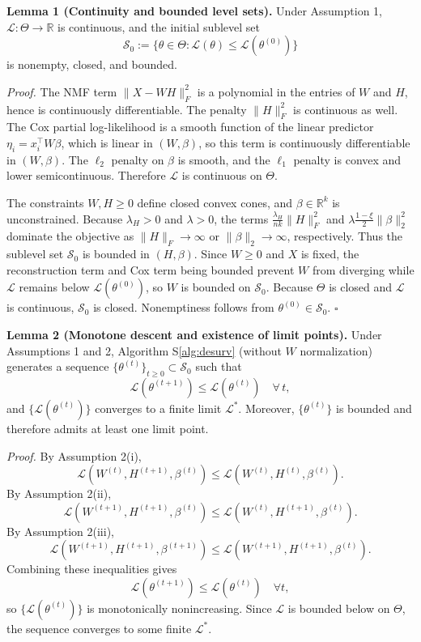 \documentclass[
]{article}
\begin{document}
\vspace{0.5em}

\textbf{Lemma 1 (Continuity and bounded level sets).} Under Assumption
1, \(\mathcal{L}:\Theta\to\mathbb{R}\) is continuous, and the initial
sublevel set \[
  \mathcal{S}_0 := \{\theta \in \Theta:
    \mathcal{L}(\theta) \le \mathcal{L}(\theta^{(0)})\}
\] is nonempty, closed, and bounded.

\emph{Proof.} The NMF term \(\|X-WH\|_F^2\) is a polynomial in the
entries of \(W\) and \(H\), hence is continuously differentiable. The
penalty \(\|H\|_F^2\) is continuous as well. The Cox partial
log-likelihood is a smooth function of the linear predictor
\(\eta_i = x_i^\top W \beta\), which is linear in \((W,\beta)\), so this
term is continuously differentiable in \((W,\beta)\). The \(\ell_2\)
penalty on \(\beta\) is smooth, and the \(\ell_1\) penalty is convex and
lower semicontinuous. Therefore \(\mathcal{L}\) is continuous on
\(\Theta\).

The constraints \(W,H\ge 0\) define closed convex cones, and
\(\beta\in\mathbb{R}^k\) is unconstrained. Because \(\lambda_H>0\) and
\(\lambda>0\), the terms \(\tfrac{\lambda_H}{nk}\|H\|_F^2\) and
\(\lambda\tfrac{1-\xi}{2}\|\beta\|_2^2\) dominate the objective as
\(\|H\|_F\to\infty\) or \(\|\beta\|_2\to\infty\), respectively. Thus the
sublevel set \(\mathcal{S}_0\) is bounded in \((H,\beta)\). Since
\(W\ge 0\) and \(X\) is fixed, the reconstruction term and Cox term
being bounded prevent \(W\) from diverging while \(\mathcal{L}\) remains
below \(\mathcal{L}(\theta^{(0)})\), so \(W\) is bounded on
\(\mathcal{S}_0\). Because \(\Theta\) is closed and \(\mathcal{L}\) is
continuous, \(\mathcal{S}_0\) is closed. Nonemptiness follows from
\(\theta^{(0)}\in\mathcal{S}_0\). \hfill\(\square\)

\vspace{0.5em}

\textbf{Lemma 2 (Monotone descent and existence of limit points).} Under
Assumptions 1 and 2, Algorithm S\ref{alg:desurv} (without \(W\)
normalization) generates a sequence
\(\{\theta^{(t)}\}_{t\ge 0}\subset\mathcal{S}_0\) such that \[
  \mathcal{L}(\theta^{(t+1)}) \le \mathcal{L}(\theta^{(t)})\quad \forall\,t,
\] and \(\{\mathcal{L}(\theta^{(t)})\}\) converges to a finite limit
\(\mathcal{L}^*\). Moreover, \(\{\theta^{(t)}\}\) is bounded and
therefore admits at least one limit point.

\emph{Proof.} By Assumption 2(i), \[
  \mathcal{L}(W^{(t)},H^{(t+1)},\beta^{(t)})
  \le
  \mathcal{L}(W^{(t)},H^{(t)},\beta^{(t)}).
\] By Assumption 2(ii), \[
  \mathcal{L}(W^{(t+1)},H^{(t+1)},\beta^{(t)})
  \le
  \mathcal{L}(W^{(t)},H^{(t+1)},\beta^{(t)}).
\] By Assumption 2(iii), \[
  \mathcal{L}(W^{(t+1)},H^{(t+1)},\beta^{(t+1)})
  \le
  \mathcal{L}(W^{(t+1)},H^{(t+1)},\beta^{(t)}).
\] Combining these inequalities gives \[
  \mathcal{L}(\theta^{(t+1)}) \le \mathcal{L}(\theta^{(t)})\quad\forall t,
\] so \(\{\mathcal{L}(\theta^{(t)})\}\) is monotonically nonincreasing.
Since \(\mathcal{L}\) is bounded below on \(\Theta\), the sequence
converges to some finite \(\mathcal{L}^*\).
\end{document}
